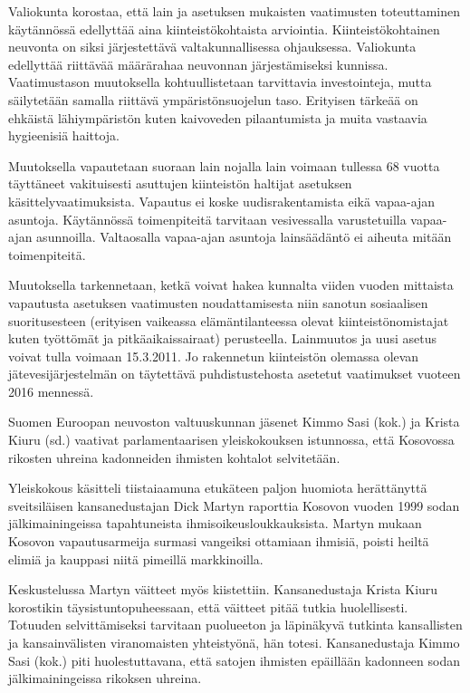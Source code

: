 Valiokunta korostaa, että lain ja asetuksen mukaisten vaatimusten
toteuttaminen käytännössä edellyttää aina kiinteistökohtaista
arviointia. Kiinteistökohtainen neuvonta on siksi järjestettävä
valtakunnallisessa ohjauksessa. Valiokunta edellyttää riittävää
määrärahaa neuvonnan järjestämiseksi kunnissa.  Vaatimustason
muutoksella kohtuullistetaan tarvittavia investointeja, mutta
säilytetään samalla riittävä ympäristönsuojelun taso. Erityisen
tärkeää on ehkäistä lähiympäristön kuten kaivoveden pilaantumista ja
muita vastaavia hygieenisiä haittoja.

Muutoksella vapautetaan suoraan lain nojalla lain voimaan tullessa 68
vuotta täyttäneet vakituisesti asuttujen kiinteistön haltijat
asetuksen käsittelyvaatimuksista. Vapautus ei koske uudisrakentamista
eikä vapaa-ajan asuntoja. Käytännössä toimenpiteitä tarvitaan
vesivessalla varustetuilla vapaa-ajan asunnoilla.  Valtaosalla
vapaa-ajan asuntoja lainsäädäntö ei aiheuta mitään toimenpiteitä.

Muutoksella tarkennetaan, ketkä voivat hakea kunnalta viiden vuoden
mittaista vapautusta asetuksen vaatimusten noudattamisesta niin
sanotun sosiaalisen suoritusesteen (erityisen vaikeassa
elämäntilanteessa olevat kiinteistönomistajat kuten työttömät ja
pitkäaikaissairaat) perusteella.  Lainmuutos ja uusi asetus voivat
tulla voimaan 15.3.2011. Jo rakennetun kiinteistön olemassa olevan
jätevesijärjestelmän on täytettävä puhdistustehosta asetetut
vaatimukset vuoteen 2016 mennessä.

Suomen Euroopan neuvoston valtuuskunnan jäsenet Kimmo Sasi (kok.) ja
Krista Kiuru (sd.) vaativat parlamentaarisen yleiskokouksen
istunnossa, että Kosovossa rikosten uhreina kadonneiden ihmisten
kohtalot selvitetään.

Yleiskokous käsitteli tiistaiaamuna etukäteen paljon huomiota
herättänyttä sveitsiläisen kansanedustajan Dick Martyn raporttia
Kosovon vuoden 1999 sodan jälkimainingeissa tapahtuneista
ihmisoikeusloukkauksista. Martyn mukaan Kosovon vapautusarmeija
surmasi vangeiksi ottamiaan ihmisiä, poisti heiltä elimiä ja kauppasi
niitä pimeillä markkinoilla.

Keskustelussa Martyn väitteet myös kiistettiin. Kansanedustaja Krista
Kiuru korostikin täysistuntopuheessaan, että väitteet pitää tutkia
huolellisesti.  Totuuden selvittämiseksi tarvitaan puolueeton ja
läpinäkyvä tutkinta kansallisten ja kansainvälisten viranomaisten
yhteistyönä, hän totesi.  Kansanedustaja Kimmo Sasi (kok.) piti
huolestuttavana, että satojen ihmisten epäillään kadonneen sodan
jälkimainingeissa rikoksen uhreina.

